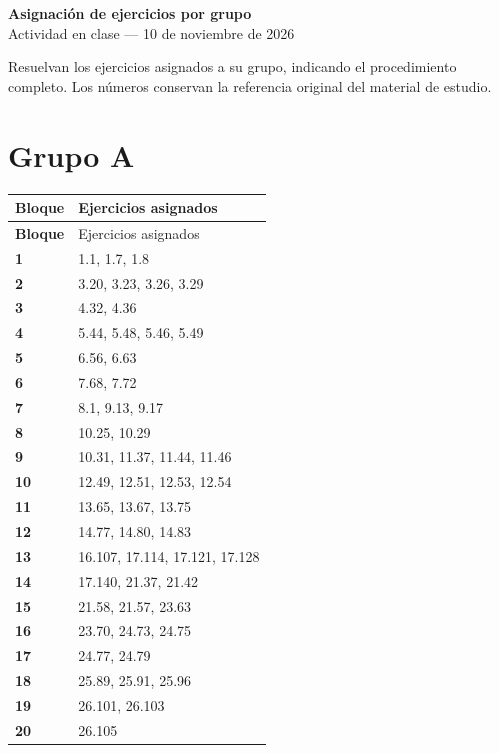 \documentclass[11pt,letterpaper]{article}
\begin{document}
\begin{center}{\LARGE\bfseries Asignación de ejercicios por grupo}\\[4pt]{\large Actividad en clase --- 10 de noviembre de 2026}\end{center}
\noindent Resuelvan los ejercicios asignados a su grupo, indicando el procedimiento completo. Los números conservan la referencia original del material de estudio.
\vspace{6pt}
\section*{Grupo A}
\small
\begin{longtable}{>{\bfseries}p{2cm}p{13.5cm}}
\toprule Bloque & Ejercicios asignados \\ \midrule
\endfirsthead
\toprule Bloque & Ejercicios asignados \\ \midrule
\endhead
1 & 1.1, 1.7, 1.8 \\
2 & 3.20, 3.23, 3.26, 3.29 \\
3 & 4.32, 4.36 \\
4 & 5.44, 5.48, 5.46, 5.49 \\
5 & 6.56, 6.63 \\
6 & 7.68, 7.72 \\
7 & 8.1, 9.13, 9.17 \\
8 & 10.25, 10.29 \\
9 & 10.31, 11.37, 11.44, 11.46 \\
10 & 12.49, 12.51, 12.53, 12.54 \\
11 & 13.65, 13.67, 13.75 \\
12 & 14.77, 14.80, 14.83 \\
13 & 16.107, 17.114, 17.121, 17.128 \\
14 & 17.140, 21.37, 21.42 \\
15 & 21.58, 21.57, 23.63 \\
16 & 23.70, 24.73, 24.75 \\
17 & 24.77, 24.79 \\
18 & 25.89, 25.91, 25.96 \\
19 & 26.101, 26.103 \\
20 & 26.105 \\
\bottomrule
\end{longtable}
\normalsize
\clearpage
\end{document}
